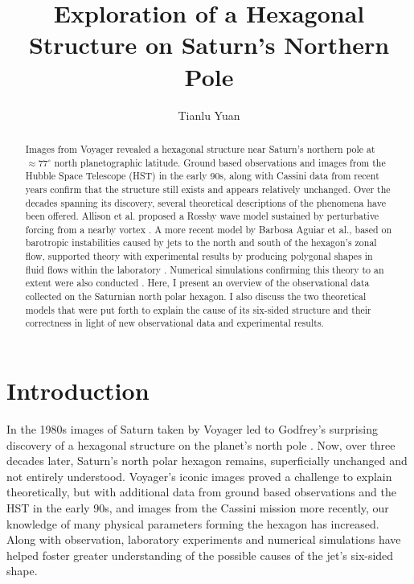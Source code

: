 \documentclass[preprint]{revtex4-1} %
\begin{document}
\title{Exploration of a Hexagonal Structure on Saturn's Northern Pole}
\author{Tianlu Yuan}

\begin{abstract}
Images from Voyager revealed a hexagonal structure near Saturn's
northern pole at $\approx 77^{\circ}$ north planetographic latitude.
Ground based observations and images from the Hubble Space Telescope (HST) in the early 90s,
along with Cassini data from recent years confirm that the structure still
exists and appears relatively unchanged.  Over the decades spanning its
discovery, several theoretical descriptions of the phenomena have been
offered.  Allison et al. proposed a Rossby wave model sustained by
perturbative forcing from a nearby vortex \cite{Allison1990}.  A more
recent model by Barbosa Aguiar et al., based on barotropic instabilities caused by jets to the north
and south of the hexagon's zonal flow, supported theory with
experimental results by producing polygonal shapes in fluid flows
within the laboratory \cite{BarbosaAguiar2010}.  Numerical simulations
confirming this theory to an extent were also conducted
\cite{MoralesJuberias2011}.  Here, I present an overview of the
observational data collected on the Saturnian north polar hexagon.  I
also discuss the two theoretical models that were put forth to explain the cause of its
six-sided structure and their correctness in light of new
observational data and experimental results.
\end{abstract}
\maketitle

\section{Introduction}
\label{sec:intro}
In the 1980s images of Saturn taken by Voyager led to Godfrey's surprising
discovery of a hexagonal structure on the planet's north pole
\cite{Godfrey1988}.  Now, over three decades later, Saturn's north
polar hexagon remains, superficially unchanged and not entirely
understood.  Voyager's iconic images proved a challenge to explain
theoretically, but with additional data from ground
based observations and the HST in the early
90s, and images from the Cassini mission more recently, our knowledge
of many physical parameters forming the hexagon has increased.  Along
with observation, laboratory experiments and numerical simulations
have helped foster greater understanding of the possible causes
of the jet's six-sided shape.
\end{document}
